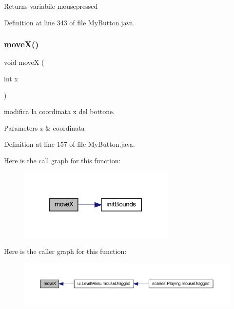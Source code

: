 \begin{DoxyReturn}{Returns}
variabile mousepressed 
\end{DoxyReturn}


Definition at line 343 of file My\+Button.\+java.

\mbox{\label{classui_1_1_my_button_ae9dd3fa33b931bab6ba8d7ec2cc24549}} 
\subsubsection{\texorpdfstring{move\+X()}{moveX()}}
{\footnotesize\ttfamily void moveX (\begin{DoxyParamCaption}\item[{int}]{x }\end{DoxyParamCaption})}



modifica la coordinata x del bottone. 


\begin{DoxyParams}{Parameters}
{\em x} & coordinata \\
\hline
\end{DoxyParams}


Definition at line 157 of file My\+Button.\+java.

Here is the call graph for this function\+:\nopagebreak
\begin{figure}[H]
\begin{center}
\leavevmode
\includegraphics[width=222pt]{classui_1_1_my_button_ae9dd3fa33b931bab6ba8d7ec2cc24549_cgraph}
\end{center}
\end{figure}
Here is the caller graph for this function\+:\nopagebreak
\begin{figure}[H]
\begin{center}
\leavevmode
\includegraphics[width=350pt]{classui_1_1_my_button_ae9dd3fa33b931bab6ba8d7ec2cc24549_icgraph}
\end{center}
\end{figure}
\mbox{\label{classui_1_1_my_button_af47bcfe7d6d4ed3655e2c61583e1b5d7}} 
